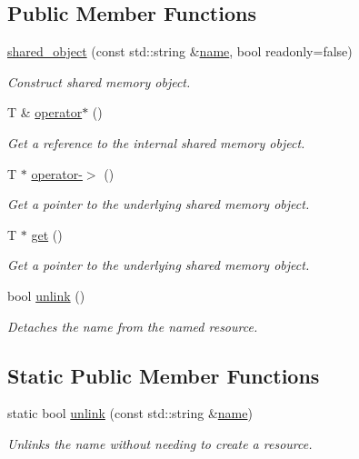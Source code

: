 \subsection*{Public Member Functions}
\begin{DoxyCompactItemize}
\item 
\hyperlink{classcpen333_1_1process_1_1shared__object_ac8e7c58b5066b058d32e27a7d068f504}{shared\+\_\+object} (const std\+::string \&\hyperlink{classcpen333_1_1process_1_1impl_1_1named__resource__base_ae0c5fbb1843afe863cece4b51c38f807}{name}, bool readonly=false)
\begin{DoxyCompactList}\small\item\em Construct shared memory object. \end{DoxyCompactList}\item 
T \& \hyperlink{classcpen333_1_1process_1_1shared__object_ad1ffd4ad5e13a87f27d9253b816b0b9f}{operator$\ast$} ()
\begin{DoxyCompactList}\small\item\em Get a reference to the internal shared memory object. \end{DoxyCompactList}\item 
T $\ast$ \hyperlink{classcpen333_1_1process_1_1shared__object_ad5a71ce94a79904c4ef85c5a5d1f44f9}{operator-\/$>$} ()
\begin{DoxyCompactList}\small\item\em Get a pointer to the underlying shared memory object. \end{DoxyCompactList}\item 
T $\ast$ \hyperlink{classcpen333_1_1process_1_1shared__object_ac6d38c3ca35cfb102905b6e9dbe4b1ce}{get} ()
\begin{DoxyCompactList}\small\item\em Get a pointer to the underlying shared memory object. \end{DoxyCompactList}\item 
bool \hyperlink{classcpen333_1_1process_1_1shared__object_aa5b43829da5bd2376927e6285745211c}{unlink} ()
\begin{DoxyCompactList}\small\item\em Detaches the name from the named resource. \end{DoxyCompactList}\end{DoxyCompactItemize}
\subsection*{Static Public Member Functions}
\begin{DoxyCompactItemize}
\item 
static bool \hyperlink{classcpen333_1_1process_1_1shared__object_a478c2228031b8471b1e729ce78aabd97}{unlink} (const std\+::string \&\hyperlink{classcpen333_1_1process_1_1impl_1_1named__resource__base_ae0c5fbb1843afe863cece4b51c38f807}{name})
\begin{DoxyCompactList}\small\item\em Unlinks the name without needing to create a resource. \end{DoxyCompactList}\end{DoxyCompactItemize}


